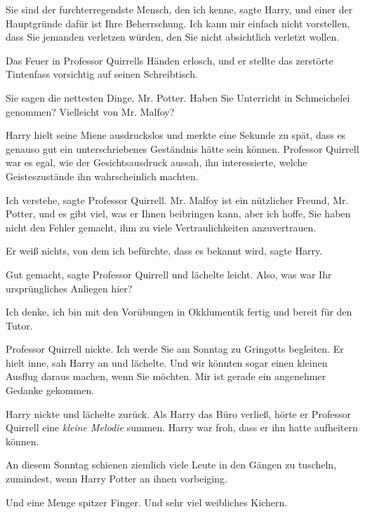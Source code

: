 \glqq{}Sie sind der furchterregendste Mensch, den ich kenne\grqq{}, sagte Harry,
\glqq{}und einer der Hauptgründe dafür ist Ihre Beherrschung. Ich kann mir
einfach nicht vorstellen, dass Sie jemanden verletzen würden, den Sie nicht
absichtlich verletzt wollen.\grqq{}

Das Feuer in Professor Quirrells Händen erlosch, und er stellte das zerstörte
Tintenfass vorsichtig auf seinen Schreibtisch.

\glqq{}Sie sagen die nettesten Dinge, Mr. Potter. Haben Sie Unterricht in
Schmeichelei genommen? Vielleicht von Mr. Malfoy?\grqq{}

Harry hielt seine Miene ausdruckslos und merkte eine Sekunde zu spät, dass es
genauso gut ein unterschriebenes Geständnis hätte sein können. Professor
Quirrell war es egal, wie der Gesichtsausdruck aussah, ihn interessierte, welche
Geisteszustände ihn wahrscheinlich machten.

\glqq{}Ich verstehe\grqq{}, sagte Professor Quirrell. \glqq{}Mr. Malfoy ist ein
nützlicher Freund, Mr. Potter, und es gibt viel, was er Ihnen beibringen kann,
aber ich hoffe, Sie haben nicht den Fehler gemacht, ihm zu viele
Vertraulichkeiten anzuvertrauen.\grqq{}

\glqq{}Er weiß nichts, von dem ich befürchte, dass es bekannt wird\grqq{}, sagte
Harry.

\glqq{}Gut gemacht\grqq{}, sagte Professor Quirrell und lächelte leicht. \glqq
Also, was war Ihr ursprüngliches Anliegen hier?\grqq{}

\glqq{}Ich denke, ich bin mit den Vorübungen in Okklumentik fertig und bereit für
den Tutor.\grqq{}

Professor Quirrell nickte. \glqq{}Ich werde Sie am Sonntag zu Gringotts
begleiten.\grqq{} Er hielt inne, sah Harry an und lächelte. \glqq{}Und wir
könnten sogar einen kleinen Ausflug daraus machen, wenn Sie möchten. Mir ist
gerade ein angenehmer Gedanke gekommen.\grqq{}

Harry nickte und lächelte zurück. Als Harry das Büro verließ, hörte er Professor
Quirrell eine \emph{kleine Melodie} summen. Harry war froh, dass er ihn hatte
aufheitern können.

An diesem Sonntag schienen ziemlich viele Leute in den Gängen zu tuscheln,
zumindest, wenn Harry Potter an ihnen vorbeiging.

Und eine Menge spitzer Finger. Und sehr viel weibliches Kichern.

